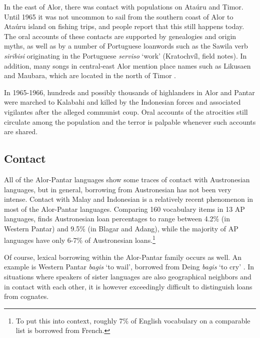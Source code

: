 In the east of Alor, there was contact with populations on Ata\'uru and Timor. Until 1965 it was not uncommon to sail from the southern coast of Alor to Ata\'uru island on fishing trips, and people report that this still happens today. The oral accounts of these contacts are supported by genealogies and origin myths, as well as by a number of Portuguese loanwords such as the Sawila verb \textit{siribisi} originating in the Portuguese \textit{serviso} `work' (Kratochv\'il, field notes). In addition, many songs in central-east Alor mention place names such as Likusaen and Maubara, which are located in the north of Timor \citep{WellfeltEtAl2013}.

In 1965-1966, hundreds and possibly thousands of highlanders in Alor and Pantar were marched to Kalabahi and killed by the Indonesian forces and associated vigilantes after the alleged communist coup. Oral accounts of the atrocities still circulate among the population and the terror is palpable whenever such accounts are shared.

\subsection{Contact}\label{sec:1:4.3}
All of the Alor-Pantar languages show some traces of contact with Austronesian languages, but in general, borrowing from Austronesian has not been very intense. Contact with Malay and Indonesian is a relatively recent phenomenon in most of the Alor-Pantar languages. Comparing {\Tilde}160 vocabulary items in 13 AP languages, \citet{Robinsontaalorpantar} finds Austronesian loan percentages to range between 4.2\% (in Western Pantar) and 9.5\% (in Blagar and Adang), while the majority of AP languages have only 6-7\% of Austronesian loans.\footnote{To put this into context,  roughly 7\% of English vocabulary on a comparable list is borrowed from French. 
}

Of course, lexical borrowing within the Alor-Pantar family occurs as well. An example is Western Pantar \textit{bagis} `to wail', borrowed from Deing \textit{bagis} `to cry' \citep{HoltonRobinsonTVhistory}. In situations where speakers of sister languages are also geographical neighbors and in contact with each other, it is however exceedingly difficult to distinguish loans from cognates.

